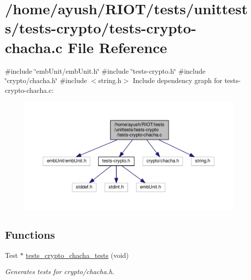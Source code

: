\hypertarget{tests-crypto-chacha_8c}{}\section{/home/ayush/\+R\+I\+O\+T/tests/unittests/tests-\/crypto/tests-\/crypto-\/chacha.c File Reference}
\label{tests-crypto-chacha_8c}
{\ttfamily \#include \char`\"{}emb\+Unit/emb\+Unit.\+h\char`\"{}}\newline
{\ttfamily \#include \char`\"{}tests-\/crypto.\+h\char`\"{}}\newline
{\ttfamily \#include \char`\"{}crypto/chacha.\+h\char`\"{}}\newline
{\ttfamily \#include $<$string.\+h$>$}\newline
Include dependency graph for tests-\/crypto-\/chacha.c\+:
\nopagebreak
\begin{figure}[H]
\begin{center}
\leavevmode
\includegraphics[width=350pt]{tests-crypto-chacha_8c__incl}
\end{center}
\end{figure}
\subsection*{Functions}
\begin{DoxyCompactItemize}
\item 
Test $\ast$ \hyperlink{group__unittests_ga57ccd7e24b05012c775da48c9d521939}{tests\+\_\+crypto\+\_\+chacha\+\_\+tests} (void)
\begin{DoxyCompactList}\small\item\em Generates tests for crypto/chacha.\+h. \end{DoxyCompactList}\end{DoxyCompactItemize}
